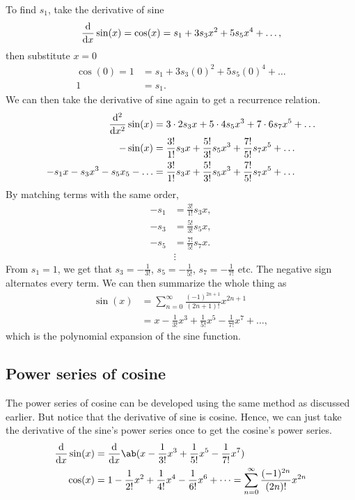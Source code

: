 To find \(s_1\), take the derivative of sine
\begin{equation}
  \odv*{\sin(x)}{x} = \cos(x) = s_1 + 3s_3x^2 + 5s_5x^4 + \dots,
\end{equation}
then substitute \(x = 0\)
\begin{align}
  \cos(0) = 1 & = s_1 + 3s_3(0)^2 + 5s_5(0)^4 + \dots \\
  1           & = s_1.
\end{align}
We can then take the derivative of sine again to get a recurrence relation.
\begin{align}
  \odv*[order = 2]{\sin(x)}{x}    & = 3\cdot 2s_3x + 5\cdot 4s_5x^3 + 7\cdot 6s_7x^5 + \dots                \\
  -\sin(x)                        & = \frac{3!}{1!}s_3x + \frac{5!}{3!}s_5x^3 + \frac{7!}{5!}s_7x^5 + \dots \\
  -s_1x - s_3x^3 - s_5x_5 - \dots & = \frac{3!}{1!}s_3x + \frac{5!}{3!}s_5x^3 + \frac{7!}{5!}s_7x^5 + \dots
\end{align}
By matching terms with the same order,
\begin{equation}
  \begin{aligned}
    -s_1 & = \frac{3!}{1!}s_3x, \\
    -s_3 & = \frac{5!}{3!}s_5x, \\
    -s_5 & = \frac{7!}{5!}s_7x. \\
         & \vdots
  \end{aligned}
\end{equation}
From \(s_1 = 1\), we get that \(s_3 = -\frac{1}{3!}\), \(s_5 = -\frac{1}{5!}\), \(s_7 = -\frac{1}{7!}\) etc. The negative sign alternates every term. We can then summarize the whole thing as
\begin{align}
  \sin(x) & = \sum_{n = 0}^{\infty}\frac{(-1)^{2n + 1}}{(2n + 1)!}x^{2n + 1}                                \\
          & = x - \frac{1}{3!}x^3 + \frac{1}{5!}x^5 - \frac{1}{7!}x^7 + \dots, \label{eq:sine-power-series}
\end{align}
which is the polynomial expansion of the sine function.

\subsection{Power series of cosine}

The power series of cosine can be developed using the same method as discussed earlier. But notice that the derivative of sine is cosine. Hence, we can just take the derivative of the sine's power series once to get the cosine's power series.
\begin{align}
  \odv*{\sin(x)}{x} & = \odv*{\ab(x - \frac{1}{3!}x^3 + \frac{1}{5!}x^5 - \frac{1}{7!}x^7)}{x}                                                                             \\
  \cos(x)           & = 1 - \frac{1}{2!}x^2 + \frac{1}{4!}x^4 - \frac{1}{6!}x^6 + \dots = \sum_{n = 0}^{\infty}\frac{(-1)^{2n}}{(2n)!}x^{2n}\label{eq:cosine-power-series}
\end{align}

